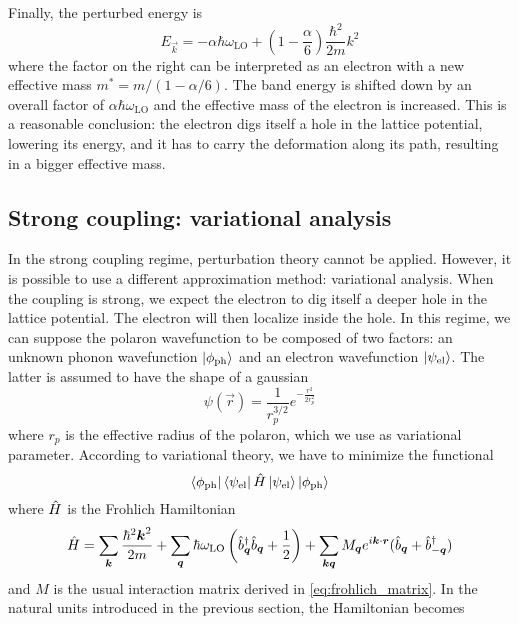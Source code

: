 Finally, the perturbed energy is
\begin{equation}
    E_\vec{k} = -\alpha \hbar \omega_\text{LO} + \left(1 - \frac{\alpha}{6}\right)\frac{\hbar^2}{2m}k^2
\end{equation}
where the factor on the right can be interpreted as an electron with a new effective mass $m^* = m / (1-\alpha/6)$. The band energy is shifted down by an overall factor of $\alpha \hbar \omega_\text{LO}$ and the effective mass of the electron is increased. This is a reasonable conclusion: the electron digs itself a hole in the lattice potential, lowering its energy, and it has to carry the deformation along its path, resulting in a bigger effective mass.

\subsection{Strong coupling: variational analysis}
In the strong coupling regime, perturbation theory cannot be applied. However, it is possible to use a different approximation method: variational analysis. When the coupling is strong, we expect the electron to dig itself a deeper hole in the lattice potential. The electron will then localize inside the hole. In this regime, we can suppose the polaron wavefunction to be composed of two factors: an unknown phonon wavefunction $\ket{\phi_\text{ph}}$ and an electron wavefunction $\ket{\psi_\text{el}}$. The latter is assumed to have the shape of a gaussian
\begin{equation}
    \psi(\vec{r}) = \frac{1}{r_p^{3/2}}e^{-\frac{r^2}{2r_p^2}}
\end{equation}
where $r_p$ is the effective radius of the polaron, which we use as variational parameter. According to variational theory, we have to minimize the functional
\begin{equation}
    \bra{\phi_\text{ph}} \bra{\psi_\text{el}} \hat{H} \ket{\psi_\text{el}} \ket{\phi_\text{ph}}
\end{equation}
where $\hat{H}$ is the Frohlich Hamiltonian
\begin{equation}
    \hat{H} = \sum_{\mathbf{\boldsymbol{k}}} \frac{\hbar^2\mathbf{\boldsymbol{k}}^2}{2m}
    + \sum_{\mathbf{\boldsymbol{q}}} \hbar \omega_\text{LO} \left( \hat{b}^\dagger_{ \mathbf{\boldsymbol{q}}} \hat{b}_{ \mathbf{\boldsymbol{q}}} + \frac{1}{2} \right)
    + \sum_{\mathbf{\boldsymbol{k}}\mathbf{\boldsymbol{q}}} M_{\mathbf{\boldsymbol{q}}} e^{i\mathbf{\boldsymbol{k}}\cdot\mathbf{\boldsymbol{r}}} (\hat{b}_{\mathbf{\boldsymbol{q}}} + \hat{b}^\dagger_{-\mathbf{\boldsymbol{q}}})
\end{equation}
and $M$ is the usual interaction matrix derived in \cref{eq:frohlich_matrix}. In the natural units introduced in the previous section, the Hamiltonian becomes
